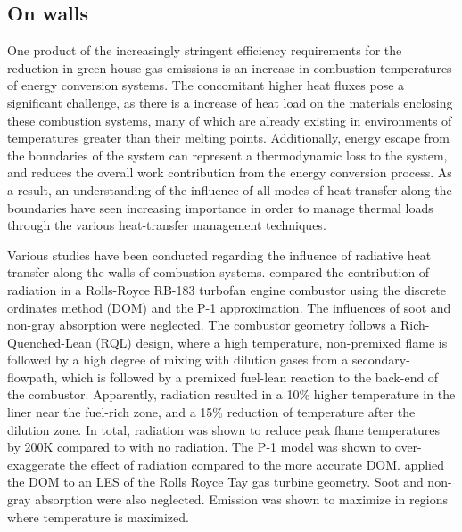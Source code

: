 \subsection{On walls}
One product of the increasingly stringent efficiency requirements for the reduction in green-house gas emissions is an increase in combustion temperatures of energy conversion systems. 
The concomitant higher heat fluxes pose a significant challenge, as there is a increase of heat load on the materials enclosing these combustion systems, many of which are already existing in environments of temperatures greater than their melting points. 
Additionally, energy escape from the boundaries of the system can represent a thermodynamic loss to the system, and reduces the overall work contribution from the energy conversion process.
As a result, an understanding of the influence of all modes of heat transfer along the boundaries have seen increasing importance in order to manage thermal loads through the various heat-transfer management techniques.

Various studies have been conducted regarding the influence of radiative heat transfer along the walls of combustion systems. \citet{Gamil2020AssessmentChamber} compared the contribution of radiation in a Rolls-Royce RB-183 turbofan engine combustor using the discrete ordinates method (DOM) and the P-1 approximation. The influences of soot and non-gray absorption were neglected.
The combustor geometry follows a Rich-Quenched-Lean (RQL) design, where a high temperature, non-premixed flame is followed by a high degree of mixing with dilution gases from a secondary-flowpath, which is followed by a premixed fuel-lean reaction to the back-end of the combustor.
Apparently, radiation resulted in a 10\% higher temperature in the liner near the fuel-rich zone, and a 15\% reduction of temperature after the dilution zone.
In total, radiation was shown to reduce peak flame temperatures by 200K compared to with no radiation.
The P-1 model was shown to over-exaggerate the effect of radiation compared to the more accurate DOM.
\citet{Paul2006RadiativeCombustor} applied the DOM to an LES of the Rolls Royce Tay gas turbine geometry. Soot and non-gray absorption were also neglected. Emission was shown to maximize in regions where temperature is maximized.


